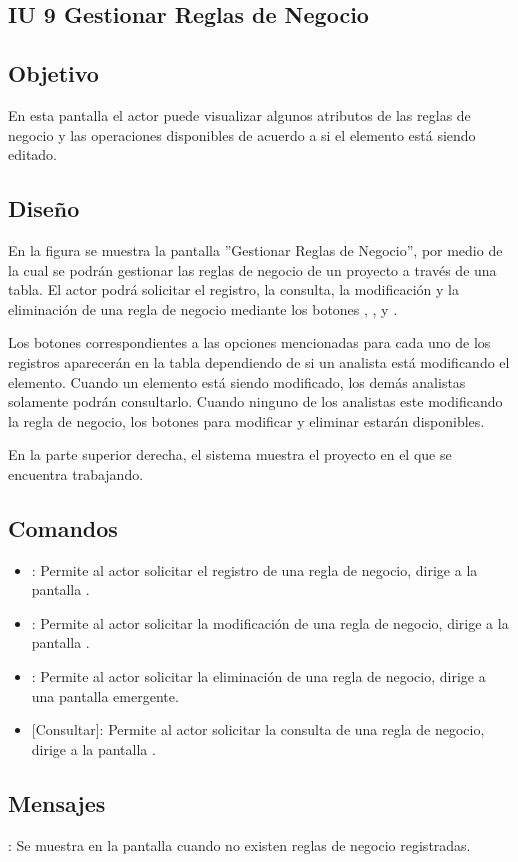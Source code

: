 \subsection{IU 9 Gestionar Reglas de Negocio}

\subsection{Objetivo}
	En esta pantalla el actor puede visualizar algunos atributos de las reglas de negocio y las operaciones disponibles de acuerdo a si el elemento está siendo editado.
\subsection{Diseño}
	En la figura  se muestra la pantalla ''Gestionar Reglas de Negocio'', por medio de la cual se podrán gestionar las reglas de negocio de un proyecto a través de una tabla. El actor podrá solicitar el registro, la consulta, la modificación y la eliminación de una regla de negocio mediante los botones , , \editar y \eliminar.
	
	Los botones correspondientes a las opciones mencionadas para cada uno de los registros aparecerán en la tabla dependiendo de si un analista está modificando el elemento. Cuando un elemento está siendo modificado, los demás analistas solamente podrán consultarlo. Cuando ninguno de los analistas este modificando la regla de negocio, los botones para modificar y eliminar estarán disponibles.
	
	En la parte superior derecha, el sistema muestra el proyecto en el que se encuentra trabajando.

\subsection{Comandos}
\begin{itemize}
	\item {}: Permite al actor solicitar el registro de una regla de negocio, dirige a la pantalla .
	\item \editar [Modificar]: Permite al actor solicitar la modificación de una regla de negocio, dirige a la pantalla .
	\item \eliminar [Eliminar]: Permite al actor solicitar la eliminación de una regla de negocio, dirige a una pantalla emergente.
	\item {} [Consultar]: Permite al actor solicitar la consulta de una regla de negocio, dirige a la pantalla  .
\end{itemize}
\subsection{Mensajes}

\begin{Citemize}
	\item {}: Se muestra en la pantalla  cuando no existen reglas de negocio registradas.
\end{Citemize}
